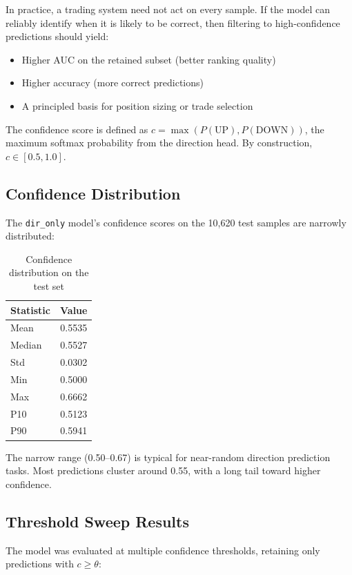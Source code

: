 \documentclass[12pt,a4paper]{article}
\begin{document}
In practice, a trading system need not act on every sample. If the model can reliably identify when it is likely to be correct, then filtering to high-confidence predictions should yield:
\begin{itemize}[noitemsep]
    \item Higher AUC on the retained subset (better ranking quality)
    \item Higher accuracy (more correct predictions)
    \item A principled basis for position sizing or trade selection
\end{itemize}

The confidence score is defined as $c = \max(P(\text{UP}), P(\text{DOWN}))$, the maximum softmax probability from the direction head. By construction, $c \in [0.5, 1.0]$.

\subsection{Confidence Distribution}

The \texttt{dir\_only} model's confidence scores on the 10,620 test samples are narrowly distributed:

\begin{table}[H]
\centering
\begin{tabular}{lc}
\toprule
\textbf{Statistic} & \textbf{Value} \\
\midrule
Mean & 0.5535 \\
Median & 0.5527 \\
Std & 0.0302 \\
Min & 0.5000 \\
Max & 0.6662 \\
P10 & 0.5123 \\
P90 & 0.5941 \\
\bottomrule
\end{tabular}
\caption{Confidence distribution on the test set}
\label{tab:conf_dist}
\end{table}

\noindent The narrow range (0.50--0.67) is typical for near-random direction prediction tasks. Most predictions cluster around 0.55, with a long tail toward higher confidence.

\subsection{Threshold Sweep Results}

The model was evaluated at multiple confidence thresholds, retaining only predictions with $c \geq \theta$:
\end{document}
